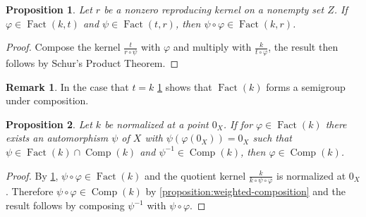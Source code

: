 \documentclass[leqno, final]{article}
\newtheorem{proposition}{Proposition}
\theoremstyle{definition}
\newtheorem{remark}{Remark}
\renewcommand{\phi}{\varphi}
\DeclareMathOperator{\Fact}{Fact}
\DeclareMathOperator{\Comp}{Comp}
\begin{document}
\begin{proposition}\label{proposition:transitive-composition}
Let $r$ be a nonzero reproducing kernel on a nonempty set $Z$.
If $\phi\in\Fact(k,t)$ and $\psi\in\Fact(t,r)$, then $\psi\circ\phi\in\Fact(k,r)$.
\end{proposition}
\begin{proof}
Compose the kernel $\frac{t}{r\circ\psi}$ with $\phi$ and multiply with $\frac{k}{t\circ\phi}$,
the result then follows by Schur's Product Theorem.
\end{proof}
\begin{remark}
In the case that $t=k$ \cref{proposition:transitive-composition} shows that $\Fact(k)$ forms
a semigroup under composition.
\end{remark}

\begin{proposition}\label{proposition:automorphism-composition}
Let $k$ be normalized at a point $0_X$. If for $\phi\in\Fact(k)$ there exists an automorphism
$\psi$ of $X$ with $\psi(\phi(0_X)) = 0_X$ such that $\psi\in\Fact(k)\cap\Comp(k)$ and
$\psi^{-1}\in\Comp(k)$, then $\phi\in\Comp(k)$.
\end{proposition}
\begin{proof}
By \cref{proposition:transitive-composition}, $\psi\circ\phi\in\Fact(k)$ and
the quotient kernel $\frac{k}{k\circ\psi\circ\phi}$ is normalized at $0_X$. Therefore
$\psi\circ\phi\in\Comp(k)$ by \cref{proposition:weighted-composition} and the result
follows by composing $\psi^{-1}$ with $\psi\circ\phi$.
\end{proof}
\end{document}
